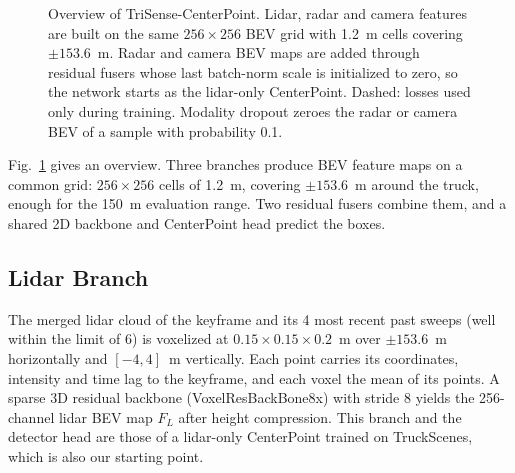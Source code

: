 \documentclass[conference]{IEEEtran}
\newcommand{\method}{TriSense-CenterPoint}
\begin{document}
\begin{figure}[t]
{}
\caption{Overview of \method. Lidar, radar and camera features are built on the same $256{\times}256$ BEV grid with
1.2~m cells covering $\pm153.6$~m. Radar and camera BEV maps are added through residual fusers whose last
batch-norm scale is initialized to zero, so the network starts as the lidar-only CenterPoint. Dashed: losses used
only during training. Modality dropout zeroes the radar or camera BEV of a sample with probability 0.1.}
\label{fig:overview}
\end{figure}

Fig.~\ref{fig:overview} gives an overview. Three branches produce BEV feature maps on a common grid: $256 \times
256$ cells of 1.2~m, covering $\pm153.6$~m around the truck, enough for the 150~m evaluation range. Two residual
fusers combine them, and a shared 2D backbone and CenterPoint head predict the boxes.

\subsection{Lidar Branch}

The merged lidar cloud of the keyframe and its 4 most recent past sweeps (well within the limit of 6) is voxelized
at $0.15 \times 0.15 \times 0.2$~m over $\pm153.6$~m horizontally and $[-4, 4]$~m vertically. Each point carries its
coordinates, intensity and time lag to the keyframe, and each voxel the mean of its points. A sparse 3D residual
backbone (VoxelResBackBone8x) with stride 8 yields the 256-channel lidar BEV map $F_L$ after height compression.
This branch and the detector head are those of a lidar-only CenterPoint trained on TruckScenes, which is also our
starting point.
\end{document}
